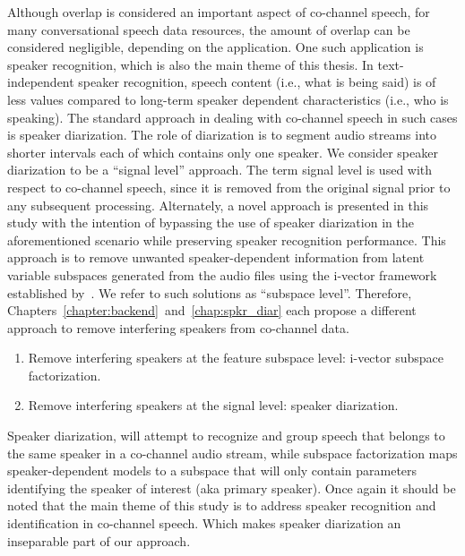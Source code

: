 Although overlap is considered an important aspect of co-channel speech, for many conversational speech data resources, the amount of overlap can be considered negligible, depending on the application. 
One such application is speaker recognition, which is also the main theme of this thesis. 
In text-independent speaker recognition, speech content (i.e., what is being said) is of less values compared to long-term speaker dependent characteristics (i.e., who is speaking). 
The standard approach in dealing with co-channel speech in such cases is speaker diarization. 
The role of diarization is to segment audio streams into shorter intervals each of which contains only one speaker. 
We consider speaker diarization to be a ``signal level'' approach. 
The term signal level is used with respect to co-channel speech, since it is removed from the original signal prior to any subsequent processing.
Alternately, a novel approach is presented in this study with the intention of bypassing the use of speaker diarization in the aforementioned scenario while preserving speaker recognition performance. 
This approach is to remove unwanted speaker-dependent information from latent variable subspaces generated from the audio files using the i-vector framework established by~\cite{dehak2011front,kenny2010bayesian}. 
We refer to such solutions as ``subspace level''. 
Therefore, Chapters~\ref{chapter:backend}~and~\ref{chap:spkr_diar} each propose a different approach to remove interfering speakers from co-channel data. 
\begin{enumerate}
\item Remove interfering speakers at the feature subspace level: i-vector subspace factorization.
\item Remove interfering speakers at the signal level: speaker diarization.
\end{enumerate}

Speaker diarization, will attempt to recognize and group speech that belongs to the same speaker in a co-channel audio stream, while subspace factorization maps speaker-dependent models to a subspace that will only contain parameters identifying the speaker of interest (aka primary speaker). 
Once again it should be noted that the main theme of this study is to address speaker recognition and identification in co-channel speech. 
Which makes speaker diarization an inseparable part of our approach. 


